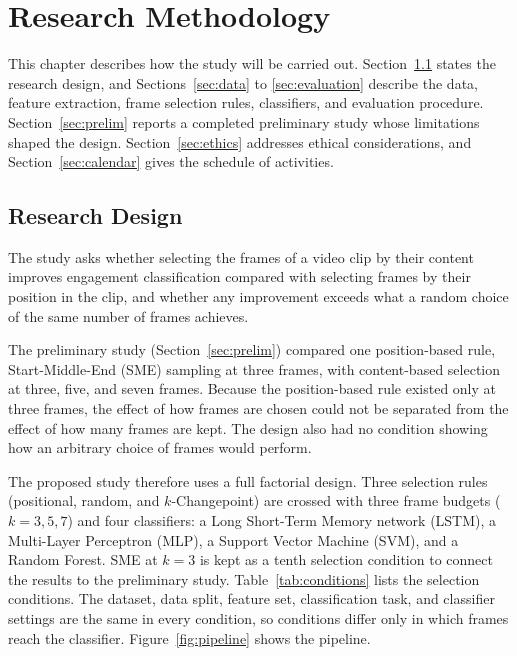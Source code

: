 %
%
%

\chapter{Research Methodology}
\label{sec:methodology}

This chapter describes how the study will be carried out. Section~\ref{sec:design} states the research design, and Sections~\ref{sec:data} to \ref{sec:evaluation} describe the data, feature extraction, frame selection rules, classifiers, and evaluation procedure. Section~\ref{sec:prelim} reports a completed preliminary study \cite{sityar2026icce} whose limitations shaped the design. Section~\ref{sec:ethics} addresses ethical considerations, and Section~\ref{sec:calendar} gives the schedule of activities.



\section{Research Design}
\label{sec:design}

The study asks whether selecting the frames of a video clip by their content improves engagement classification compared with selecting frames by their position in the clip, and whether any improvement exceeds what a random choice of the same number of frames achieves.

The preliminary study (Section~\ref{sec:prelim}) compared one position-based rule, Start-Middle-End (SME) sampling at three frames, with content-based selection at three, five, and seven frames. Because the position-based rule existed only at three frames, the effect of how frames are chosen could not be separated from the effect of how many frames are kept. The design also had no condition showing how an arbitrary choice of frames would perform.

The proposed study therefore uses a full factorial design. Three selection rules (positional, random, and $k$-Changepoint) are crossed with three frame budgets ($k = 3, 5, 7$) and four classifiers: a Long Short-Term Memory network (LSTM), a Multi-Layer Perceptron (MLP), a Support Vector Machine (SVM), and a Random Forest. SME at $k = 3$ is kept as a tenth selection condition to connect the results to the preliminary study. Table~\ref{tab:conditions} lists the selection conditions. The dataset, data split, feature set, classification task, and classifier settings are the same in every condition, so conditions differ only in which frames reach the classifier. Figure~\ref{fig:pipeline} shows the pipeline. 

